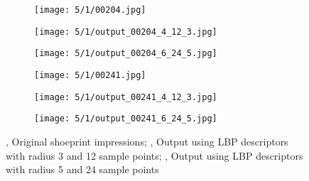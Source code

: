\documentclass[draft,final]{vutinfth} %
\begin{document}
\begin{figure}[h]
  \centering
	\begin{subfigure}[t]{0.16\columnwidth}
    \centering
    \texttt{[image: 5/1/00204.jpg]}
    \subcaption{}
    \label{fig:pe:204:orig}
  \end{subfigure}
  \begin{subfigure}[t]{0.16\columnwidth}
    \centering
    \texttt{[image: 5/1/output\_00204\_4\_12\_3.jpg]}
    \subcaption{}
    \label{fig:pe:204:LBPs}
  \end{subfigure}
  \begin{subfigure}[t]{0.16\columnwidth}
    \centering
    \texttt{[image: 5/1/output\_00204\_6\_24\_5.jpg]}
    \subcaption{}
    \label{fig:pe:204:LBPb}
  \end{subfigure}
  \begin{subfigure}[t]{0.16\columnwidth}
    \centering
    \texttt{[image: 5/1/00241.jpg]}
    \subcaption{}
    \label{fig:pe:241:orig}
  \end{subfigure}
  \begin{subfigure}[t]{0.16\columnwidth}
    \centering
    \texttt{[image: 5/1/output\_00241\_4\_12\_3.jpg]}
    \subcaption{}
    \label{fig:pe:241:LBPs}
  \end{subfigure}
  \begin{subfigure}[t]{0.16\columnwidth}
    \centering
    \texttt{[image: 5/1/output\_00241\_6\_24\_5.jpg]}
    \subcaption{}
    \label{fig:pe:241:LBPb}
  \end{subfigure}
  \caption{,   Original shoeprint impressions; ,  Output using LBP descriptors with radius 3 and 12 sample points; ,  Output using LBP descriptors with radius 5 and 24 sample points}
  \label{fig:pe:LPBexp}
\end{figure}
\end{document}

